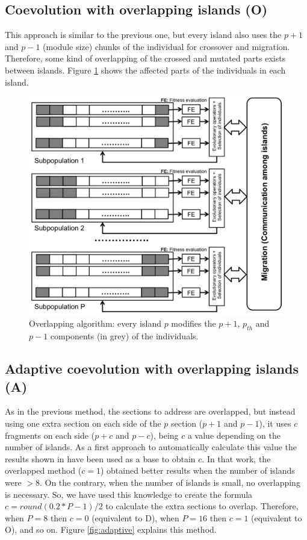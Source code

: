 \documentclass[preprint]{elsarticle}
\begin{document}
\subsection{Coevolution with overlapping islands (O)}
This approach is similar to the previous one, but every island also uses the $p+1$ and $p-1$ (module size) chunks of the individual for crossover and migration. Therefore, some kind of overlapping of the crossed and mutated parts exists between islands. Figure \ref{fig:overlapping} shows the affected parts of the individuals in
each island. 

\begin{figure}[h!tb]
\centering
\includegraphics[width=12cm]{islandNoDisjoint.jpg}
\caption{Overlapping algorithm: every island $p$ modifies the  $p+1$,
  $p_{th}$ and $p-1$  components (in grey) of the individuals.}
  \label{fig:overlapping}
\end{figure}

\subsection{Adaptive coevolution with overlapping islands (A)} 
As in the previous method, the sections to address are overlapped, but
instead using one extra section on each side of the $p$ section ($p+1$
and $p-1$), it uses $c$ fragments on each side ($p+c$ and $p-c$),
being $c$ a value depending on the number of islands.
As a first
approach to automatically calculate this value the results shown in
\citep{Garcia16hpmoon} have been used as a base to obtain $c$. In that
work, the overlapped method ($c=1$) obtained better results when the
number of islands were $>$8. On the contrary, when the number of
islands is small, no overlapping is necessary. So, we have used this
knowledge to create the formula $c=round(0.2*P-1)/2$ to calculate the
extra sections to overlap. Therefore, when $P=8$ then $c=0$
(equivalent to D), when $P=16$ then $c=1$ (equivalent to O), and so
on. Figure \ref{fig:adaptive} explains this method. 
\end{document}
